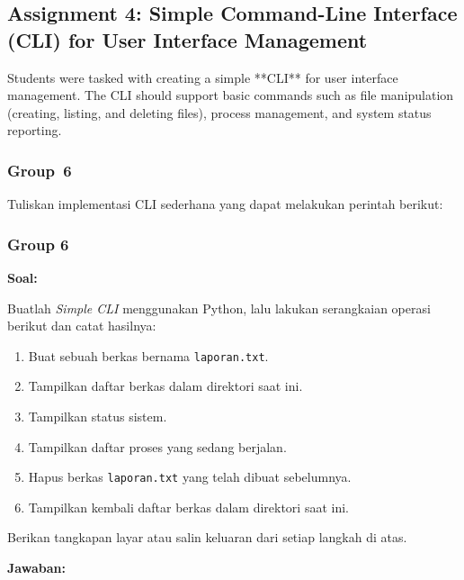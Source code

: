 \documentclass[12pt]{article}
\begin{document}
\subsection{Assignment 4: Simple Command-Line Interface (CLI) for User Interface Management}
Students were tasked with creating a simple **CLI** for user interface management. The CLI should support basic commands such as file manipulation (creating, listing, and deleting files), process management, and system status reporting.
\subsubsection {Group 6}
Tuliskan implementasi CLI sederhana yang dapat melakukan perintah berikut:

\subsubsection{Group 6}

\textbf{Soal:}

Buatlah \textit{Simple CLI} menggunakan Python, lalu lakukan serangkaian operasi berikut dan catat hasilnya:

    \begin{enumerate}
        \item Buat sebuah berkas bernama \texttt{laporan.txt}.
        \item Tampilkan daftar berkas dalam direktori saat ini.
        \item Tampilkan status sistem.
        \item Tampilkan daftar proses yang sedang berjalan.
        \item Hapus berkas \texttt{laporan.txt} yang telah dibuat sebelumnya.
        \item Tampilkan kembali daftar berkas dalam direktori saat ini.
    \end{enumerate}

Berikan tangkapan layar atau salin keluaran dari setiap langkah di atas.

\textbf{Jawaban:}
\end{document}
